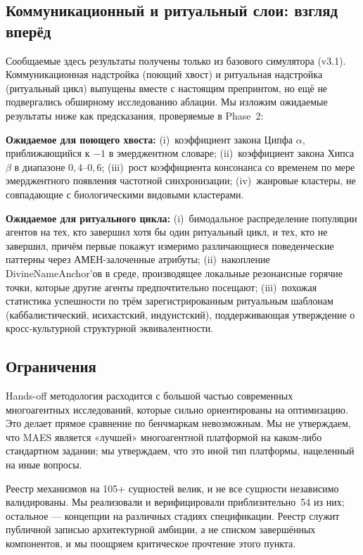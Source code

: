 \documentclass[11pt,a4paper]{article}
\begin{document}
\subsection{Коммуникационный и ритуальный слои: взгляд вперёд}

Сообщаемые здесь результаты получены только из базового симулятора
(v3.1). Коммуникационная надстройка (поющий хвост) и ритуальная
надстройка (ритуальный цикл) выпущены вместе с настоящим препринтом, но
ещё не подвергались обширному исследованию аблации. Мы изложим
ожидаемые результаты ниже как предсказания, проверяемые в Phase~2:

\textbf{Ожидаемое для поющего хвоста:} (i)~коэффициент закона Ципфа
$\alpha$, приближающийся к $-1$ в эмерджентном словаре; (ii)~коэффициент
закона Хипса $\beta$ в диапазоне $0,4$--$0,6$; (iii)~рост коэффициента
консонанса со временем по мере эмерджентного появления частотной
синхронизации; (iv)~жанровые кластеры, не совпадающие с биологическими
видовыми кластерами.

\textbf{Ожидаемое для ритуального цикла:} (i)~бимодальное распределение
популяции агентов на тех, кто завершил хотя бы один ритуальный цикл, и
тех, кто не завершил, причём первые покажут измеримо различающиеся
поведенческие паттерны через АМЕН-залоченные атрибуты;
(ii)~накопление DivineNameAnchor'ов в среде, производящее локальные
резонансные горячие точки, которые другие агенты предпочтительно
посещают; (iii)~похожая статистика успешности по трём
зарегистрированным ритуальным шаблонам (каббалистический, исихастский,
индуистский), поддерживающая утверждение о кросс-культурной структурной
эквивалентности.

\subsection{Ограничения}

Hands-off методология расходится с большой частью современных
многоагентных исследований, которые сильно ориентированы на оптимизацию.
Это делает прямое сравнение по бенчмаркам невозможным. Мы не
утверждаем, что MAES является «лучшей» многоагентной платформой на
каком-либо стандартном задании; мы утверждаем, что это иной тип
платформы, нацеленный на иные вопросы.

Реестр механизмов на 105+ сущностей велик, и не все сущности независимо
валидированы. Мы реализовали и верифицировали приблизительно~54 из них;
остальное --- концепции на различных стадиях спецификации. Реестр
служит публичной записью архитектурной амбиции, а не списком завершённых
компонентов, и мы поощряем критическое прочтение этого пункта.
\end{document}
